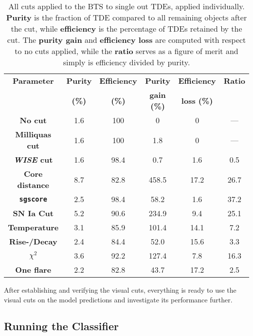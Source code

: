 \begin{table}
    \centering
    \def\arraystretch{1.2}
    \begin{tabular}{c c c c c c}
        \textbf{Parameter}         & \textbf{Purity} & \textbf{Efficiency} & \textbf{Purity}    & \textbf{Efficiency} & \textbf{Ratio} \\
                                   & \textbf{(\%)}   & \textbf{(\%)}       & \textbf{gain (\%)} & \textbf{loss (\%)}  &                \\
        \hline
        \textbf{No cut}            & 1.6             & 100                 & 0                  & 0                   & ---            \\
        \textbf{Milliquas cut}     & 1.6             & 100                 & 1.8                & 0                   & ---            \\
        \textbf{\textit{WISE} cut} & 1.6             & 98.4                & 0.7                & 1.6                 & 0.5            \\
        \textbf{Core distance}     & 8.7             & 82.8                & 458.5              & 17.2                & 26.7           \\
        \textbf{\texttt{sgscore}}  & 2.5             & 98.4                & 58.2               & 1.6                 & 37.2           \\
        \textbf{SN Ia Cut}         & 5.2             & 90.6                & 234.9              & 9.4                 & 25.1           \\
        \textbf{Temperature}       & 3.1             & 85.9                & 101.4              & 14.1                & 7.2            \\
        \textbf{Rise-/Decay}       & 2.4             & 84.4                & 52.0               & 15.6                & 3.3            \\
        \textbf{$\chi^2$}          & 3.6             & 92.2                & 127.4              & 7.8                 & 16.3           \\
        \textbf{One flare}         & 2.2             & 82.8                & 43.7               & 17.2                & 2.5            \\
    \end{tabular}
    \caption[BTS visual cuts]{All cuts applied to the BTS to single out TDEs, applied individually. \textbf{Purity} is the fraction of TDE compared to all remaining objects after the cut, while \textbf{efficiency} is the percentage of TDEs retained by the cut. The \textbf{purity gain} and \textbf{efficiency loss} are computed with respect to no cuts applied, while the \textbf{ratio} serves as a figure of merit and simply is efficiency divided by purity.}
    \label{tab:visual_selection}
\end{table}

After establishing and verifying the visual cuts, everything is ready to use the visual cuts on the model predictions and investigate its performance further.

\subsection{Running the Classifier}

